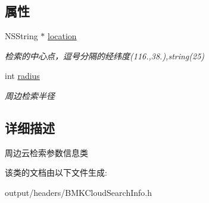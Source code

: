 \subsection*{属性}
\begin{DoxyCompactItemize}
\item 
\hypertarget{interface_b_m_k_cloud_nearby_search_info_ae129357a1f589b69f9a2f8ca3613f015}{}N\+S\+String $\ast$ \hyperlink{interface_b_m_k_cloud_nearby_search_info_ae129357a1f589b69f9a2f8ca3613f015}{location}\label{interface_b_m_k_cloud_nearby_search_info_ae129357a1f589b69f9a2f8ca3613f015}

\begin{DoxyCompactList}\small\item\em 检索的中心点，逗号分隔的经纬度(116.,38.),string(25) \end{DoxyCompactList}\item 
\hypertarget{interface_b_m_k_cloud_nearby_search_info_af736625a3a921ec13dd0c8a6deb1c52f}{}int \hyperlink{interface_b_m_k_cloud_nearby_search_info_af736625a3a921ec13dd0c8a6deb1c52f}{radius}\label{interface_b_m_k_cloud_nearby_search_info_af736625a3a921ec13dd0c8a6deb1c52f}

\begin{DoxyCompactList}\small\item\em 周边检索半径 \end{DoxyCompactList}\end{DoxyCompactItemize}


\subsection{详细描述}
周边云检索参数信息类 

该类的文档由以下文件生成\+:\begin{DoxyCompactItemize}
\item 
output/headers/B\+M\+K\+Cloud\+Search\+Info.\+h\end{DoxyCompactItemize}
